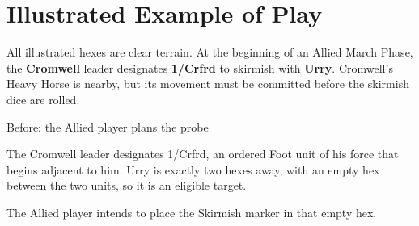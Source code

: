 \section{Illustrated Example of Play}

All illustrated hexes are clear terrain. At the beginning of an Allied March
Phase, the \textbf{Cromwell} leader designates \textbf{1/Crfrd} to skirmish with
\textbf{Urry}. Cromwell's Heavy Horse is nearby, but its movement must be
committed before the skirmish dice are rolled.

\begin{examplebox}{Before: the Allied player plans the probe}
\begin{minipage}[c]{.58\linewidth}
\centering
{}
\end{minipage}\hfill
\begin{minipage}[c]{.38\linewidth}
\small
The Cromwell leader designates 1/Crfrd, an ordered Foot unit of his force that
begins adjacent to him. Urry is exactly two hexes away, with an empty hex between
the two units, so it is an eligible target.

The Allied player intends to place the Skirmish marker in that empty hex.
\end{minipage}
\end{examplebox}

